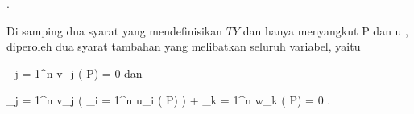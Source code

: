 { { . }

Di samping dua syarat yang mendefinisikan $TY$ dan hanya menyangkut
\mathkor {} {P} {dan} {u} {,}
diperoleh dua syarat tambahan yang melibatkan seluruh variabel, yaitu

\mavergleichskettedisp
{\vergleichskette
{ \sum_{j = 1}^n v_j {  } ( P)
}
{ =} { 0
}
{ } {
}
{ } {
}
{ } {
}
}
{}{}{}
dan

\mavergleichskettedisp
{\vergleichskette
{ \sum_{j = 1}^n v_j  \left(  \sum_{i = 1}^n u_i {  }  {  } ( P)  \right)      + \sum_{k = 1}^n w_k {  } ( P)
}
{ =} { 0
}
{ } {
}
{ } {
}
{ } {
}
}
{}{}{.}

}

